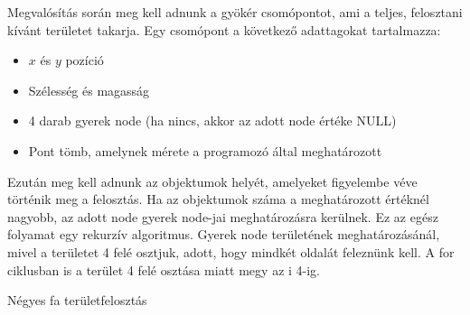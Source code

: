 Megvalósítás során meg kell adnunk a gyökér csomópontot, ami a teljes, felosztani kívánt területet takarja. Egy csomópont a következő adattagokat tartalmazza:
\begin{itemize}
\item $x$ és $y$ pozíció
\item Szélesség és magasság
\item 4 darab gyerek node (ha nincs, akkor az adott node értéke NULL)
\item Pont tömb, amelynek mérete a programozó által meghatározott
\end{itemize}

Ezután meg kell adnunk az objektumok helyét, amelyeket figyelembe véve történik meg a felosztás. Ha az objektumok száma a meghatározott értéknél nagyobb, az adott node gyerek node-jai meghatározásra kerülnek. Ez az egész folyamat egy rekurzív algoritmus. Gyerek node területének meghatározásánál, mivel a területet 4 felé osztjuk, adott, hogy mindkét oldalát feleznünk kell. A for ciklusban is a terület 4 felé osztása miatt megy az i 4-ig. 

\begin{algorithm}[H]
 \caption{Négyes fa területfelosztás}
\end{algorithm}
